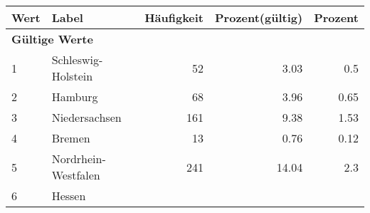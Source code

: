      \begin{longtable}{lXrrr}
     \toprule
     \textbf{Wert} & \textbf{Label} & \textbf{Häufigkeit} & \textbf{Prozent(gültig)} & \textbf{Prozent} \\
     \endhead
     \midrule
     \multicolumn{5}{l}{\textbf{Gültige Werte}}\\

     1 &
     \multicolumn{1}{X}{ Schleswig-Holstein   } &


       \num{52} &
       \num[round-mode=places,round-precision=2]{3,03} &
         \num[round-mode=places,round-precision=2]{0,5} \\

     2 &
     \multicolumn{1}{X}{ Hamburg   } &


       \num{68} &
       \num[round-mode=places,round-precision=2]{3,96} &
         \num[round-mode=places,round-precision=2]{0,65} \\

     3 &
     \multicolumn{1}{X}{ Niedersachsen   } &


       \num{161} &
       \num[round-mode=places,round-precision=2]{9,38} &
         \num[round-mode=places,round-precision=2]{1,53} \\

     4 &
     \multicolumn{1}{X}{ Bremen   } &


       \num{13} &
       \num[round-mode=places,round-precision=2]{0,76} &
         \num[round-mode=places,round-precision=2]{0,12} \\

     5 &
     \multicolumn{1}{X}{ Nordrhein-Westfalen   } &


       \num{241} &
       \num[round-mode=places,round-precision=2]{14,04} &
         \num[round-mode=places,round-precision=2]{2,3} \\

     6 &
     \multicolumn{1}{X}{ Hessen   } &



\end{longtable}
